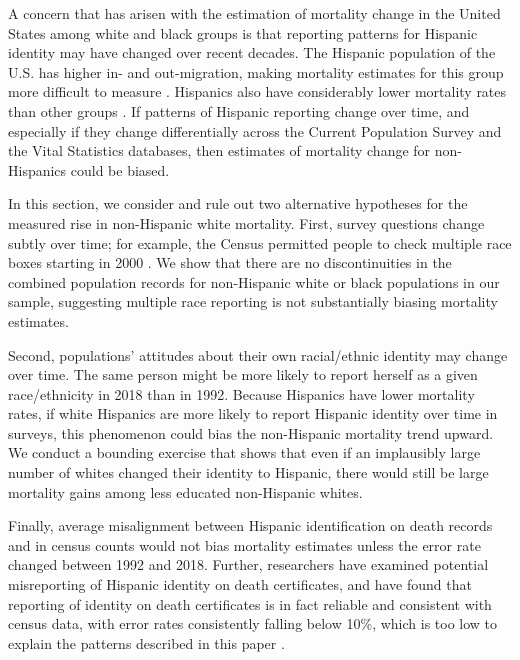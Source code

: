 A concern that has arisen with the estimation of mortality change in the United States among white and black groups is that reporting patterns for Hispanic identity may have changed over recent decades. The Hispanic population of the U.S. has higher in- and out-migration, making mortality estimates for this group more difficult to measure \citep{Markides2005}.  Hispanics also have considerably lower mortality rates than other groups \citep{Palloni2004,Markides2005}. If patterns of Hispanic reporting change over time, and especially if they change differentially across the Current Population Survey and the Vital Statistics databases, then estimates of mortality change for non-Hispanics could be biased.

In this section, we consider and rule out two alternative hypotheses for the measured rise in non-Hispanic white mortality. First, survey questions change subtly over time; for example, the Census permitted people to check multiple race boxes starting in 2000 \citep{Currie2018}. We show that there are no discontinuities in the combined population records for non-Hispanic white or black populations in our sample, suggesting multiple race reporting is not substantially biasing mortality estimates.

Second, populations' attitudes about their own racial/ethnic identity may change over time. The same person might be more likely to report herself as a given race/ethnicity in 2018 than in 1992. Because Hispanics have lower mortality rates, if white Hispanics are more likely to report Hispanic identity over time in surveys, this phenomenon could bias the non-Hispanic mortality trend upward. We conduct a bounding exercise that shows that even if an implausibly large number of whites changed their identity to Hispanic, there would still be large mortality gains among less educated non-Hispanic whites.

Finally, average misalignment between Hispanic identification on death records and in census counts would not bias mortality estimates unless the error rate changed between 1992 and 2018. Further, researchers have examined potential misreporting of Hispanic identity on death certificates, and have found that reporting of identity on death certificates is in fact reliable and consistent with census data, with error rates consistently falling below 10\%, which is too low to explain the patterns described in this paper \citep{Rosenberg1999,Arias2008,Arias2010,Ruiz2013}.

